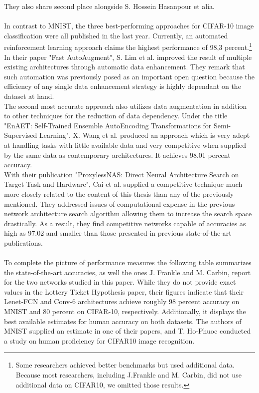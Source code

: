 They also share second place alongside S. Hossein Hasanpour et alia.\cite{Keep-It-Simple}\\
\\
\newpage
In contrast to MNIST, the three best-performing approaches for CIFAR-10 image classification were all published in the last year. Currently, an automated reinforcement learning approach claims the highest performance of 98,3 percent.\footnote{Some researchers achieved better benchmarks but used additional data. Because most researchers, including J.Frankle and M. Carbin, did not use additional data on CIFAR10, we omitted those results.}
In their paper "Fast AutoAugment", S. Lim et al. improved the result of multiple existing architectures through automatic data enhancement. They remark that such automation was previously posed as an important open question because the efficiency of any single data enhancement strategy is highly dependant on the dataset at hand.\cite{Auto-Augment}\\
The second most accurate approach also utilizes data augmentation in addition to other techniques for the reduction of data dependency. Under the title "EnAET: Self-Trained Ensemble AutoEncoding Transformations for Semi-Supervised Learning", X. Wang et al. produced an approach which is very adept at handling tasks with little available data and very competitive when supplied by the same data as contemporary architectures. It achieves 98,01 percent accuracy.\cite{EnAET}\\
With their publication "ProxylessNAS: Direct Neural Architecture Search on Target Task and Hardware", Cai et al. supplied a competitive technique much more closely related to the content of this thesis than any of the previously mentioned. They addressed issues of computational expense in the previous network architecture search algorithm allowing them to increase the search space drastically. As a result, they find competitive networks capable of accuracies as high as 97.02 and smaller than those presented in previous state-of-the-art publications.\cite{Direct-NAS}\\
\\ 
To complete the picture of performance measures the following table summarizes the state-of-the-art accuracies, as well the ones J. Frankle and M. Carbin, report for the two networks studied in this paper.   
While they do not provide exact values in the Lottery Ticket Hypothesis paper, their figures indicate that their Lenet-FCN and Conv-6 architectures achieve roughly 98 percent accuracy on MNIST and 80 percent on CIFAR-10, respectively. \cite{LTH} Additionally, it displays the best available estimates for human accuracy on both datasets. The authors of MNIST supplied an estimate in one of their papers, and T. Ho-Phuoc conducted a study on human proficiency for CIFAR10 image recognition.\cite{MNIST-Human}\cite{CIFAR10-Human}\\
